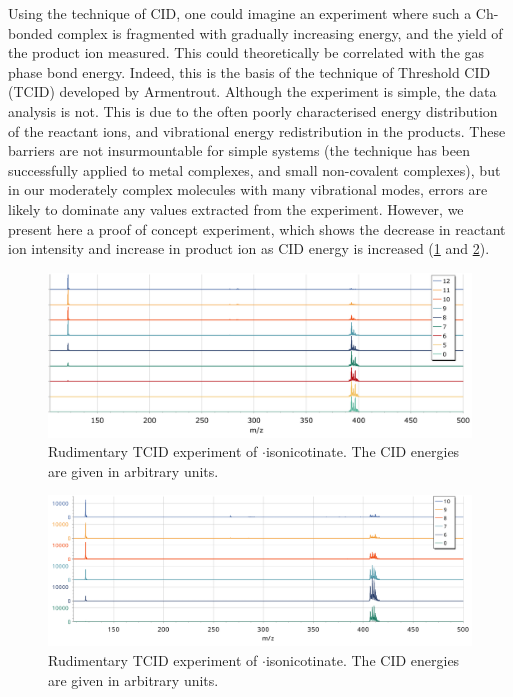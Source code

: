 \begin{refsection}
Using the technique of CID, one could imagine an experiment where such a Ch-bonded complex is fragmented with gradually increasing energy, and the yield of the product ion measured.
This could theoretically be correlated with the gas phase bond energy.
Indeed, this is the basis of the technique of Threshold CID (TCID) developed by Armentrout.\autocite{Armentrout2003,Rodgers2000,Narancic2007}
Although the experiment is simple, the data analysis is not.
This is due to the often poorly characterised energy distribution of the reactant ions, and vibrational energy redistribution in the products.
These barriers are not insurmountable for simple systems (the technique has been successfully applied to metal complexes, and small non-covalent complexes), but in our moderately complex molecules with many vibrational modes, errors are likely to dominate any values extracted from the experiment.
However, we present here a proof of concept experiment, which shows the decrease in reactant ion intensity and increase in product ion as CID energy is increased (\cref{fig:ebs-ph-tcid} and \cref{fig:ebs-bn-tcid}).

\begin{figure}
    \centering
    \includegraphics[width=\linewidth]{Figures/ebs-ph-cid.pdf}
    \caption[TCID experiment of $\cdot$isonicotinate]{Rudimentary TCID experiment of $\cdot$isonicotinate. The CID energies are given in arbitrary units.}
    \label{fig:ebs-ph-tcid}
\end{figure}

\begin{figure}
  \centering
  \includegraphics[width=\linewidth]{Figures/ebs-bn-cid.pdf}
  \caption[TCID experiment of $\cdot$isonicotinate]{Rudimentary TCID experiment of $\cdot$isonicotinate. The CID energies are given in arbitrary units.}
  \label{fig:ebs-bn-tcid}
\end{figure}


\end{refsection}
